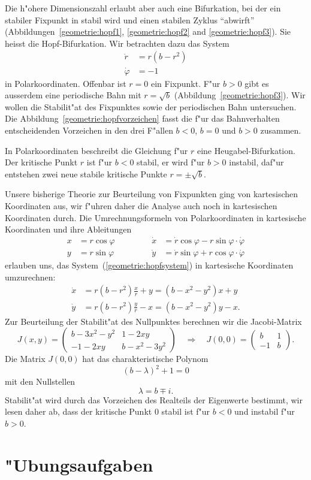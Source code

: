 Die h"ohere Dimensionszahl erlaubt aber auch eine Bifurkation, bei der
ein stabiler Fixpunkt in stabil wird und einen stabilen Zyklus ``abwirft''
(Abbildungen~\ref{geometrie:hopf1}, \ref{geometrie:hopf2} and
\ref{geometrie:hopf3}).
Sie heisst die Hopf-Bifurkation.
Wir betrachten dazu das System 
\begin{equation}
\begin{aligned}
\dot r      &= r(b-r^2)\\
\dot \varphi&= -1
\end{aligned}
\label{geometrie:hopfsystem}
\end{equation}
in Polarkoordinaten.
Offenbar ist $r=0$ ein Fixpunkt.
F"ur $b>0$ gibt es ausserdem eine periodische Bahn mit $r=\sqrt{b}$
(Abbildung~\ref{geometrie:hopf3}).
Wir wollen die Stabilit"at des Fixpunktes sowie der periodischen Bahn
untersuchen.
Die Abbildung~\ref{geometrie:hopfvorzeichen} fasst die f"ur das Bahnverhalten
entscheidenden Vorzeichen in den drei F"allen $b<0$, $b=0$ und $b>0$
zusammen.

In Polarkoordinaten beschreibt die Gleichung f"ur $r$ eine
Heugabel-Bifurkation.
Der kritische Punkt $r$ ist f"ur $b<0$ stabil, er wird f"ur $b>0$
instabil, daf"ur entstehen zwei neue stabile kritische Punkte
$r=\pm\sqrt{b}$.

Unsere bisherige Theorie zur Beurteilung von Fixpunkten ging von
kartesischen Koordinaten aus, wir f"uhren daher die Analyse auch noch
in kartesischen Koordinaten durch.
Die Umrechnungsformeln von Polarkoordinaten in kartesische Koordinaten
und ihre Ableitungen
\[
\begin{aligned}
x&=r\cos\varphi&&\qquad&\dot x&=\dot r\cos\varphi-r\sin\varphi\cdot\dot\varphi\\
y&=r\sin\varphi&&\qquad&\dot y&=\dot r\sin\varphi+r\cos\varphi\cdot\dot\varphi
\end{aligned}
\]
erlauben uns,
das System~(\ref{geometrie:hopfsystem}) in kartesische Koordinaten
umzurechnen:
\begin{equation}
\begin{aligned}
\dot x&=r(b-r^2)\frac{x}{r}+y=(b-x^2-y^2)x+y\\
\dot y&=r(b-r^2)\frac{y}{r}-x=(b-x^2-y^2)y-x.
\end{aligned}
\label{geometrie:hopf-kartesisch}
\end{equation}
Zur Beurteilung der Stabilit"at des Nullpunktes berechnen wir die
Jacobi-Matrix
\[
J(x,y)=
\begin{pmatrix}
b-3x^2-y^2&1-2xy\\
-1-2xy&b-x^2-3y^2
\end{pmatrix}
\quad\Rightarrow\quad
J(0,0)=\begin{pmatrix}
b&1\\-1&b
\end{pmatrix}.
\]
Die Matrix $J(0,0)$ hat das charakteristische Polynom
\[
(b-\lambda)^2+1=0
\]
mit den Nullstellen
\[
\lambda=b\mp i.
\]
Stabilit"at wird durch das Vorzeichen des Realteils der Eigenwerte
bestimmt, wir lesen daher ab, dass der kritische Punkt $0$ stabil
ist f"ur $b<0$ und instabil f"ur $b>0$.

\section{"Ubungsaufgaben}

